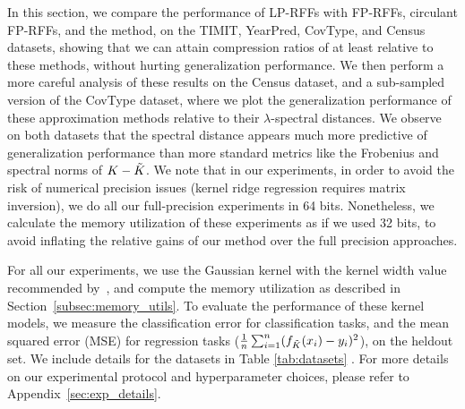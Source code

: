 In this section, we compare the performance of LP-RFFs with FP-RFFs, circulant FP-RFFs, and the \Nystrom method, on the TIMIT, YearPred, CovType, and Census datasets, showing that we can attain compression ratios of at least  relative to these methods, without hurting generalization performance. We then perform a more careful analysis of these results on the Census dataset, and a sub-sampled version of the CovType dataset, where we plot the generalization performance of these approximation methods relative to their $\lambda$-spectral distances.  We observe on both datasets that the spectral distance appears much more predictive of generalization performance than more standard metrics like the Frobenius and spectral norms of $K-\tilde{K}$.  We note that in our experiments, in order to avoid the risk of numerical precision issues (kernel ridge regression requires matrix inversion), we do all our full-precision experiments in 64 bits.  Nonetheless, we calculate the memory utilization of these experiments as if we used 32 bits, to avoid inflating the relative gains of our method over the full precision approaches.

For all our experiments, we use the Gaussian kernel with the kernel width value recommended by~\citet{may2017}, and compute the memory utilization as described in Section~\ref{subsec:memory_utils}. To evaluate the performance of these kernel models, we measure the classification error for classification tasks, and the mean squared error (MSE) for regression tasks ($\frac{1}{n}\sum_{i=1}^n (f_{\tilde{K}}(x_i) - y_i)^2$), on the heldout set. We include details for the datasets in Table \ref{tab:datasets} . For more details on our experimental protocol and hyperparameter choices, please refer to Appendix~\ref{sec:exp_details}.

